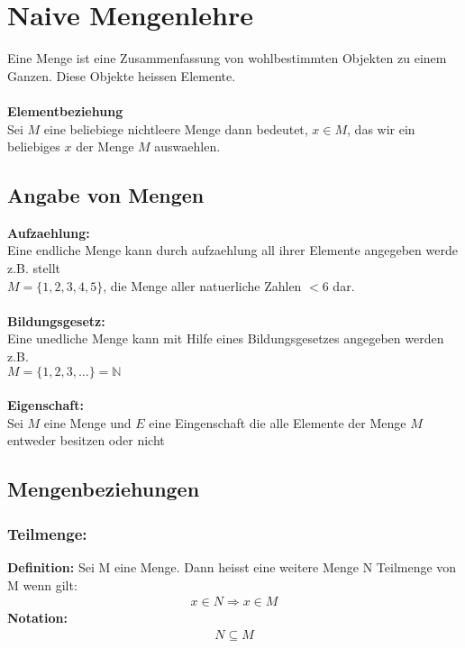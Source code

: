\documentclass[../AbiMappe_Mathe.tex]{subfiles}
\begin{document}
\theoremstyle{nonumberplain}



\section{Naive Mengenlehre}
Eine Menge ist eine Zusammenfassung von wohlbestimmten Objekten zu einem Ganzen.
Diese Objekte heissen Elemente.\\\\
\textbf{Elementbeziehung}\\
Sei $M$ eine beliebiege nichtleere Menge dann bedeutet, $x \in M$, das wir ein beliebiges $x$ der Menge $M$ auswaehlen.

\subsection{Angabe von Mengen}
\textbf{Aufzaehlung:}\\
Eine endliche Menge kann durch aufzaehlung all ihrer Elemente angegeben werde z.B. stellt\\ $M=\{1,2,3,4,5\}$, die Menge aller natuerliche Zahlen $<6$ dar.\\\\
\textbf{Bildungsgesetz:}\\
Eine unedliche Menge kann mit Hilfe eines Bildungsgesetzes angegeben werden z.B. \\$M=\{1,2,3,\dots\}=\mathbb{N}$\\\\
\textbf{Eigenschaft:}\\
Sei $M$ eine Menge und $E$ eine Eingenschaft die alle Elemente der Menge $M$ entweder besitzen oder nicht
\subsection{Mengenbeziehungen}

\subsubsection{Teilmenge:}
\textbf{Definition:} Sei M eine Menge. Dann heisst eine weitere Menge N Teilmenge von M wenn gilt:
\begin{align*}
x \in N \Rightarrow x \in M
\end{align*}
\textbf{Notation:} 
\begin{align*}
N \subseteq M
\end{align*}
\end{document}
